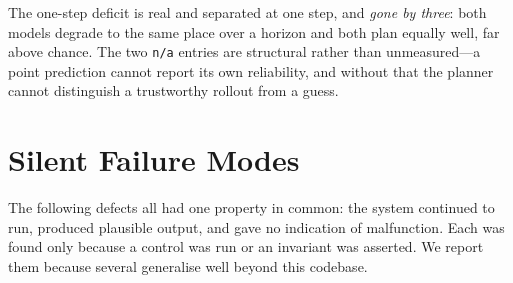 \documentclass[10pt,twocolumn]{article}
\begin{document}
The one-step deficit is real and separated at one step, and \emph{gone by
three}: both models degrade to the same place over a horizon and both plan
equally well, far above chance. The two \texttt{n/a} entries are structural
rather than unmeasured---a point prediction cannot report its own reliability,
and without that the planner cannot distinguish a trustworthy rollout from a
guess.

\section{Silent Failure Modes}
\label{sec:silent}

The following defects all had one property in common: the system continued to
run, produced plausible output, and gave no indication of malfunction. Each was
found only because a control was run or an invariant was asserted. We report
them because several generalise well beyond this codebase.
\end{document}
